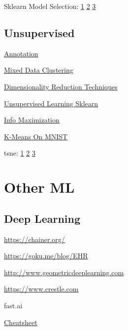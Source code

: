 \documentclass[]{book}
\begin{document}
Sklearn Model Selection:
\href{http://scikit-learn.org/stable/modules/generated/sklearn.model_selection.GroupKFold.html}{1}
\textbar{}
\href{http://scikit-learn.org/stable/modules/generated/sklearn.model_selection.LeaveOneGroupOut.html}{2}
\textbar{}
\href{http://scikit-learn.org/stable/modules/generated/sklearn.model_selection.LeavePGroupsOut.html}{3}

\subsection{Unsupervised}\label{unsupervised}

\href{https://explosion.ai/blog/prodigy-annotation-tool-active-learning}{Annotation}

\href{https://www.r-bloggers.com/clustering-mixed-data-types-in-r/}{Mixed
Data Clustering}

\href{https://colah.github.io/posts/2014-10-Visualizing-MNIST/}{Dimensionality
Reduction Techniques}

\href{http://opensource.datacratic.com/mtlpy50/}{Unsupervised Learning
Sklearn}

\href{http://www.inference.vc/unsupervised-learning-by-predicting-noise-an-information-maximization-view-2/}{Info
Maximization}

\href{http://johnloeber.com/docs/kmeans.html}{K-Means On MNIST}

tsne: \href{http://distill.pub/2016/misread-tsne/}{1} \textbar{}
\href{https://lvdmaaten.github.io/tsne/}{2} \textbar{}
\href{https://index.pocketcluster.io/harveyslash-tsne-embedding-visualisation.html}{3}

\section{Other ML}\label{other-ml}

\subsection{Deep Learning}\label{deep-learning-1}

\url{https://chainer.org/}

\url{https://goku.me/blog/EHR}

\url{http://www.geometricdeeplearning.com}

\url{https://www.crestle.com}

fast.ai

\href{https://stanford.edu/~shervine/teaching/cs-229/cheatsheet-deep-learning}{Cheatsheet}
\end{document}
